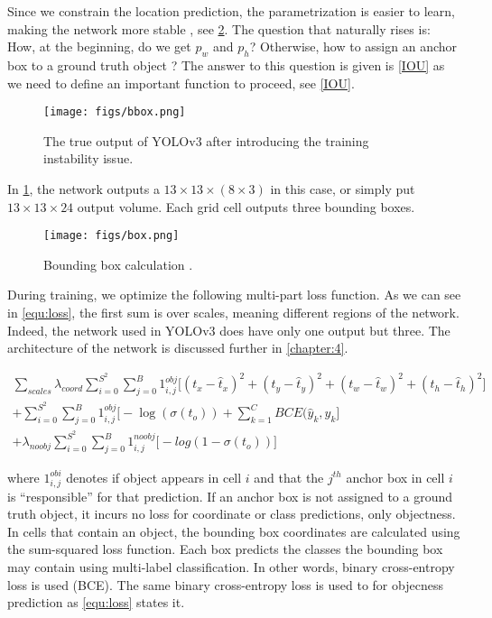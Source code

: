 Since we constrain the location prediction, the
parametrization is easier to learn, making the network
more stable \cite{YOLOv2}, see \cref{fig:bbox_calculation}.
The question that naturally rises is: How, at the beginning, do we get $p_{w}$ and $p_{h}$? Otherwise, how to assign an anchor box to a ground truth object ?
The answer to this question is given is \cref{IOU} as we need to define an important function to proceed, see \cref{IOU}.

\bigskip
\begin{figure}[!htbp]
  \centering
  \texttt{[image: figs/bbox.png]}
  \caption[The true output of YOLOv3]{The true output of YOLOv3 after introducing the training instability issue.}\label{fig:true_yolo_output}
\end{figure}

In \cref{fig:true_yolo_output}, the network outputs a $ 13 \times 13 \times (8 \times 3)$ in this case, or simply put $13 \times 13 \times 24$ output volume. Each grid cell outputs three bounding boxes.

\begin{figure}[!htpb]
  \centering
  \texttt{[image: figs/box.png]}
  \caption[Bounding box calculation]{Bounding box calculation \cite{YOLOv2}.}\label{fig:bbox_calculation}
\end{figure}

During training, we optimize the following multi-part loss function. As we can see in \cref{equ:loss}, the first sum is over scales, meaning different regions of the network. Indeed, the network used in YOLOv3 does have only one output but three. The architecture of the network is discussed further in \cref{chapter:4}.

\begin{multline}
  \label{equ:loss}
  \sum_{scales} \lambda_{coord} \sum_{i=0}^{S^2}  \sum_{j=0}^{B} {1}^{obj}_{i,j}  \big[ (t_x - \hat{t}_x)^2  +  (t_y - \hat{t}_y)^2  +  (t_w - \hat{t}_w)^2  +  (t_h - \hat{t}_h)^2  \big] \\
+ \sum_{i=0}^{S^2}  \sum_{j=0}^{B} {1}^{obj}_{i,j} \big[ - \log(\sigma(t_o))  + \sum_{k=1}^{C} BCE(\hat{y}_k, y_k \big]   \\
+ \lambda_{noobj} \sum_{i=0}^{S^2}  \sum_{j=0}^{B} {1}^{noobj}_{i,j}  \big[ -log(1-\sigma(t_o))  \big]
\end{multline}

where $1^{obi}_{i, j}$ denotes if object appears in cell $i$ and that the $j^{th}$ anchor box in cell $i$ is “responsible” for that prediction.
If an anchor box is not assigned to a ground truth object, it incurs no loss for coordinate or class predictions, only objectness.
In cells that contain an object, the bounding box coordinates are calculated using the sum-squared loss function.
Each box predicts the classes the bounding box may contain using multi-label classification. In other words, binary cross-entropy loss is used (BCE).
The same binary cross-entropy loss is used to for objecness prediction as \cref{equ:loss} states it.

